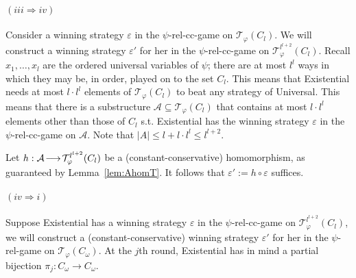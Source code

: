 \documentclass{LMCS}
\newcommand{\homm}{
  \ensuremath{
      \negthinspace 
      \longrightarrow
      \negthinspace
  }
}
\begin{document}
\paragraph{$(iii \Rightarrow iv)$}
Consider a winning strategy $\varepsilon$ in the $\psi$-rel-cc-game on $\mathcal{T}_\varphi(C_l)$. We will construct a winning strategy $\varepsilon'$ for her in the $\psi$-rel-cc-game on $\mathcal{T}^{l^{l+2}}_\varphi(C_l)$.
Recall $x_1,\ldots,x_l$ are the ordered universal variables of $\psi$; there are at most $l^l$ ways in which they may be, in order, played on to the set $C_l$. This means that Existential needs at most $l\cdot l^l$ elements of $\mathcal{T}_\varphi(C_l)$ to beat any strategy of Universal. This means that there is a substructure $\mathcal{A} \subseteq \mathcal{T}_\varphi(C_l)$ that contains at most $l\cdot l^l$ elements other than those of $C_l$ s.t. Existential has the winning strategy $\varepsilon$ in the $\psi$-rel-cc-game on $\mathcal{A}$. Note that $|A| \leq l+l\cdot l^l \leq l^{l+2}$.

Let $h:\mathcal{A} \homm \mathcal{T}^{l^{l+2}}_\varphi(C_l)$ be a (constant-conservative) homomorphism, as guaranteed by Lemma~\ref{lem:AhomT}. It follows that $\varepsilon':=h \circ \varepsilon$ suffices.


\paragraph{$(iv \Rightarrow i)$}
Suppose Existential has a winning strategy $\varepsilon$ in the $\psi$-rel-cc-game on $\mathcal{T}^{l^{l+2}}_\varphi(C_l)$, we will construct a (constant-conservative) winning strategy $\varepsilon'$ for her in the $\psi$-rel-game on $\mathcal{T}_\varphi(C_\omega)$. At the $j$th round, Existential has in mind a partial bijection $\pi_j:C_\omega \rightarrow C_\omega$.\enlargethispage{2\baselineskip}
\end{document}
